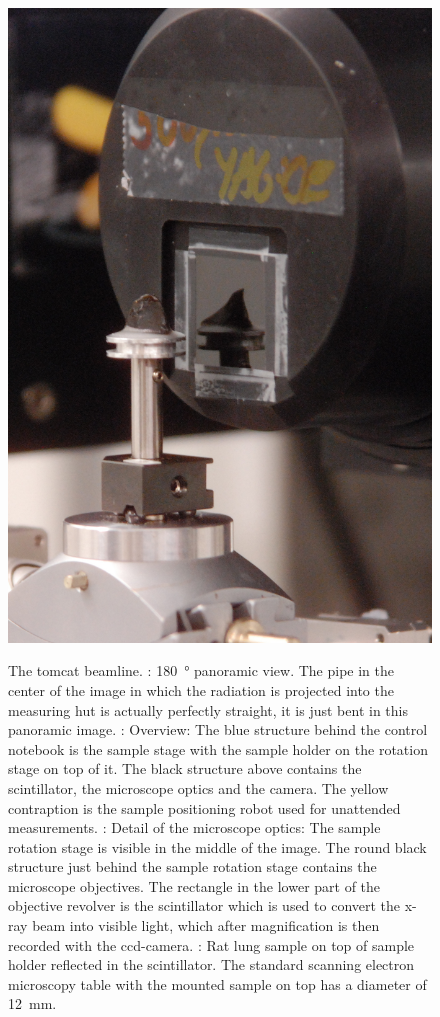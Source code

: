 \begin{figure}[p]
{{			\includegraphics[width=\imsize]{img/TOMCAT3}%
			\label{subfig:TOMCAT3}%
		}%

	}%
	\caption[The \acs{tomcat} beamline]{The \ac{tomcat} beamline. : \SI{180}{\degree} panoramic view. The pipe in the center of the image in which the radiation is projected into the measuring hut is actually perfectly straight, it is just bent in this panoramic image. : Overview: The blue structure behind the control notebook is the sample stage with the sample holder on the rotation stage on top of it. The black structure above contains the scintillator, the microscope optics and the camera. The yellow contraption is the sample positioning robot used for unattended measurements. : Detail of the microscope optics: The sample rotation stage is visible in the middle of the image. The round black structure just behind the sample rotation stage contains the microscope objectives. The rectangle in the lower part of the objective revolver is the scintillator which is used to convert the x-ray beam into visible light, which after magnification is then recorded with the \ac{ccd}-camera. : Rat lung sample on top of sample holder reflected in the scintillator. The standard scanning electron microscopy table with the mounted sample on top has a diameter of \SI{12}{\milli\meter}.}%
	\label{fig:tomcat}
\end{figure}%

